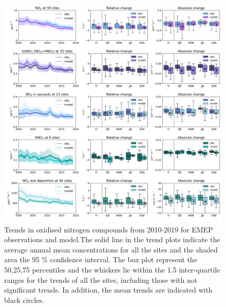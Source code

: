 \begin{figure}
	\centering
	\includegraphics[width=0.74\paperwidth]{FIGS_TRENDS/Nox_trends.png}
	\caption{\label{fig:NOx_trends}Trends in oxidised nitrogen compounds from 2010-2019 for EMEP observations and model.The solid line in the trend plots indicate the average annual mean concentrations for all the sites and the shaded area the 95 \% confidence interval. The box plot represent the 50,25,75 percentiles and the whiskers lie within the 1.5 inter-quartile ranges for the trends of all the sites, including those with not significant trends. In addition, the mean trends are indicated with black circles.}
\end{figure}


